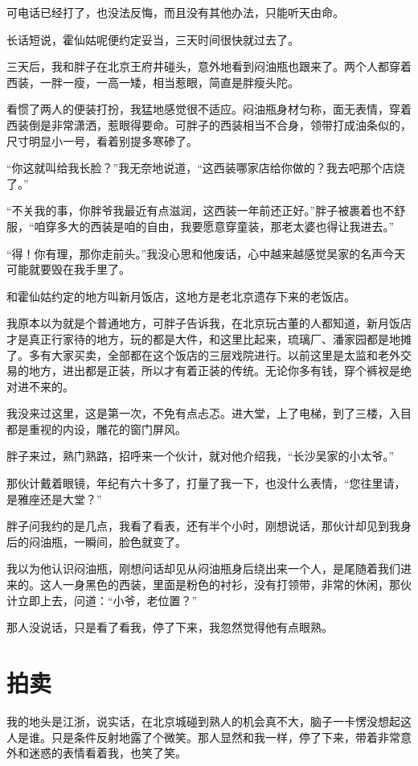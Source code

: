可电话已经打了，也没法反悔，而且没有其他办法，只能听天由命。

长话短说，霍仙姑呢便约定妥当，三天时间很快就过去了。

三天后，我和胖子在北京王府井碰头，意外地看到闷油瓶也跟来了。两个人都穿着西装，一胖一瘦，一高一矮，相当惹眼，简直是胖瘦头陀。

看惯了两人的便装打扮，我猛地感觉很不适应。闷油瓶身材匀称，面无表情，穿着西装倒是非常潇洒，惹眼得要命。可胖子的西装相当不合身，领带打成油条似的，尺寸明显小一号，看着别提多寒碜了。

“你这就叫给我长脸？”我无奈地说道，“这西装哪家店给你做的？我去吧那个店烧了。”

“不关我的事，你胖爷我最近有点滋润，这西装一年前还正好。”胖子被裹着也不舒服，“咱穿多大的西装是咱的自由，我要愿意穿童装，那老太婆也得让我进去。”

“得！你有理，那你走前头。”我没心思和他废话，心中越来越感觉吴家的名声今天可能就要毁在我手里了。

和霍仙姑约定的地方叫新月饭店，这地方是老北京遗存下来的老饭店。

我原本以为就是个普通地方，可胖子告诉我，在北京玩古董的人都知道，新月饭店才是真正行家待的地方，玩的都是大件，和这里比起来，琉璃厂、潘家园都是地摊了。多有大家买卖，全部都在这个饭店的三层戏院进行。以前这里是太监和老外交易的地方，进出都是正装，所以才有着正装的传统。无论你多有钱，穿个裤衩是绝对进不来的。

我没来过这里，这是第一次，不免有点忐忑。进大堂，上了电梯，到了三楼，入目都是重视的内设，雕花的窗门屏风。

胖子来过，熟门熟路，招呼来一个伙计，就对他介绍我，“长沙吴家的小太爷。”

那伙计戴着眼镜，年纪有六十多了，打量了我一下，也没什么表情，“您往里请，是雅座还是大堂？”

胖子问我约的是几点，我看了看表，还有半个小时，刚想说话，那伙计却见到我身后的闷油瓶，一瞬间，脸色就变了。

我以为他认识闷油瓶，刚想问话却见从闷油瓶身后绕出来一个人，是尾随着我们进来的。这人一身黑色的西装，里面是粉色的衬衫，没有打领带，非常的休闲，那伙计立即上去，问道：“小爷，老位置？”

那人没说话，只是看了看我，停了下来，我忽然觉得他有点眼熟。

\chapter{拍卖}

我的地头是江浙，说实话，在北京城碰到熟人的机会真不大，脑子一卡愣没想起这人是谁。只是条件反射地露了个微笑。那人显然和我一样，停了下来，带着非常意外和迷惑的表情看着我，也笑了笑。

